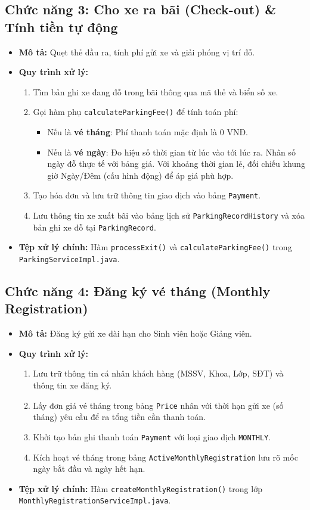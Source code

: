 \documentclass[12pt,a4paper]{article}
\begin{document}
\subsection{Chức năng 3: Cho xe ra bãi (Check-out) \& Tính tiền tự động}
\begin{itemize}
    \item \textbf{Mô tả:} Quẹt thẻ đầu ra, tính phí gửi xe và giải phóng vị trí đỗ.
    \item \textbf{Quy trình xử lý:}
    \begin{enumerate}
        \item Tìm bản ghi xe đang đỗ trong bãi thông qua mã thẻ và biển số xe.
        \item Gọi hàm phụ \texttt{calculateParkingFee()} để tính toán phí:
        \begin{itemize}
            \item Nếu là \textbf{vé tháng}: Phí thanh toán mặc định là $0$ VNĐ.
            \item Nếu là \textbf{vé ngày}: Đo hiệu số thời gian từ lúc vào tới lúc ra. Nhân số ngày đỗ thực tế với bảng giá. Với khoảng thời gian lẻ, đối chiếu khung giờ Ngày/Đêm (cấu hình động) để áp giá phù hợp.
        \end{itemize}
        \item Tạo hóa đơn và lưu trữ thông tin giao dịch vào bảng \texttt{Payment}.
        \item Lưu thông tin xe xuất bãi vào bảng lịch sử \texttt{ParkingRecordHistory} và xóa bản ghi xe đỗ tại \texttt{ParkingRecord}.
    \end{enumerate}
    \item \textbf{Tệp xử lý chính:} Hàm \texttt{processExit()} và \texttt{calculateParkingFee()} trong \texttt{ParkingServiceImpl.java}.
\end{itemize}

\subsection{Chức năng 4: Đăng ký vé tháng (Monthly Registration)}
\begin{itemize}
    \item \textbf{Mô tả:} Đăng ký gửi xe dài hạn cho Sinh viên hoặc Giảng viên.
    \item \textbf{Quy trình xử lý:}
    \begin{enumerate}
        \item Lưu trữ thông tin cá nhân khách hàng (MSSV, Khoa, Lớp, SĐT) và thông tin xe đăng ký.
        \item Lấy đơn giá vé tháng trong bảng \texttt{Price} nhân với thời hạn gửi xe (số tháng) yêu cầu để ra tổng tiền cần thanh toán.
        \item Khởi tạo bản ghi thanh toán \texttt{Payment} với loại giao dịch \texttt{MONTHLY}.
        \item Kích hoạt vé tháng trong bảng \texttt{ActiveMonthlyRegistration} lưu rõ mốc ngày bắt đầu và ngày hết hạn.
    \end{enumerate}
    \item \textbf{Tệp xử lý chính:} Hàm \texttt{createMonthlyRegistration()} trong lớp \texttt{MonthlyRegistrationServiceImpl.java}.
\end{itemize}
\end{document}
